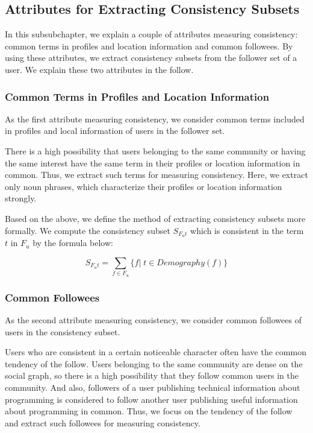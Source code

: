 \subsection{Attributes for Extracting Consistency Subsets}
\label{subsec:Attributes}

In this subsubchapter, we explain a couple of attributes measuring
consistency: common terms in profiles and location information and
common followees.  By using these attributes, we extract consistency
subsets from the follower set of a user.  We explain these two
attributes in the follow.

\subsubsection{Common Terms in Profiles and Location Information}
\label{subsec:Terms}

As the first attribute measuring consistency, we consider common terms
included in profiles and local information of users in the follower set.

There is a high possibility that users belonging to the same community
or having the same interest have the same term in their profiles or
location information in common.  Thus, we extract such terms for
measuring consistency.  Here, we extract only noun phrases, which
characterize their profiles or location information strongly.

Based on the above, we define the method of extracting consistency
subsets more formally.  We compute the consistency subset $S_{F_ut}$
which is consistent in the term $t$ in $F_u$ by the formula below:

\vspace{-1ex}
\[
 S_{F_ut} =  \sum_{f \in F_u} \{f|\;t \in \mathit{Demography}(f) \}
\]
\vspace{-2ex}


\subsubsection{Common Followees}
\label{subsec:Followees}

As the second attribute measuring consistency, we consider common
followees of users in the consistency subset.

Users who are consistent in a certain noticeable character often have
the common tendency of the follow.  Users belonging to the same
community are dense on the social graph, so there is a high possibility
that they follow common users in the community.  And also, followers of
a user publishing technical information about programming is considered
to follow another user publishing useful information about programming
in common.  Thus, we focus on the tendency of the follow and extract
such followees for measuring consistency.

